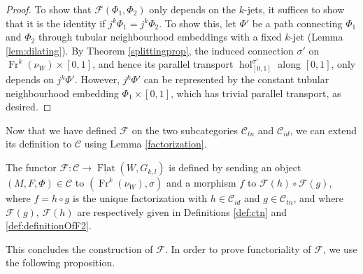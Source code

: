 \documentclass[10pt]{amsart}
\newcommand{\F}{{\mathcal{F}}}
\newcommand{\hol}{{\operatorname{hol}}}
\newcommand{\FlatCat}{{\underline{\operatorname{Flat}}}}
\newcommand{\Fr}{{\operatorname{Fr}}}
\newcommand{\C}{\mathcal{C}}
\numberwithin{theoremalpha}{section}
\numberwithin{equation}{section}
\numberwithin{definition}{section}
\numberwithin{theorem}{section}
\numberwithin{proposition}{section}
\numberwithin{lemma}{section}
\numberwithin{example}{section}
\numberwithin{remark}{section}
\numberwithin{corollary}{section}
\numberwithin{question}{section}
\numberwithin{problem}{section}
\numberwithin{assumption}{section}
\theoremstyle{named}
\numberwithin{equation}{section}
\begin{document}
\begin{proof}
To show that $\F(\Phi_1,\Phi_2)$ only depends on the $k$-jets, it suffices to show that it is the identity if $j^k\Phi_{1} = j^k\Phi_{2}$. To show this, let $\Phi'$ be a path connecting $\Phi_1$ and $\Phi_2$ through tubular neighbourhood embeddings with a fixed $k$-jet (Lemma  \ref{lem:dilating}). By Theorem \ref{splittingprop}, the induced connection $\sigma'$ on $\Fr^{k}(\nu_{W}) \times [0,1]$, and hence its parallel transport $\hol^{\sigma'}_{[0,1]}$ along $[0,1]$, only depends on $j^k\Phi'$. However, $j^k\Phi'$ can be represented by the constant tubular neighbourhood embedding $\Phi_{1} \times [0,1]$, which has trivial parallel transport, as desired.
\end{proof}

Now that we have defined $\F$ on the two subcategories $\mathcal{C}_{tn}$ and $\mathcal{C}_{id}$, we can extend its definition to $\C$ using Lemma \ref{factorization}.

\begin{definition} \label{functorFdef}
The functor $\F: \mathcal{C} \to \FlatCat(W,G_{k,l})$ is defined by sending an object $(M, F, \Phi) \in \mathcal{C}$ to $(\Fr^{k}(\nu_{W}), \sigma)$ and a morphism $f$ to $\F(h) \circ \F(g)$, where $f = h \circ g$ is the unique factorization with $h \in \mathcal{C}_{id}$ and $g \in \mathcal{C}_{tn}$, and where $\F(g)$, $\F(h)$ are respectively given in Definitions \ref{def:ctn} and \ref{def:definitionOfF2}. 
\end{definition}

This concludes the construction of $\F$. In order to prove functoriality of $\F$, we use the following proposition. 
\end{document}

